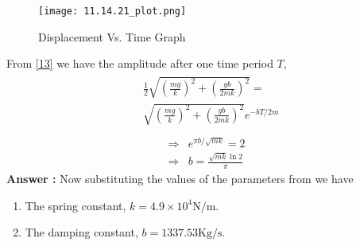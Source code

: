 \documentclass[journal,12pt,twocolumn]{IEEEtran}
\theoremstyle{remark}
\begin{document}
\begin{enumerate}
\begin{figure}[h]
    \centering
    \texttt{[image: 11.14.21\_plot.png]}
    \caption{Displacement  Vs. Time Graph}
    \label{Fig-2}
\end{figure}
From \eqref{13} we have the amplitude after one time period $T$,
\begin{align}
\begin{split}
&\frac{1}{2}\sqrt{\left(\frac{mg}{k}\right)^2+\left(\frac{gb}{2mk}\right)^2}= \\
&\sqrt{\left(\frac{mg}{k}\right)^2+\left(\frac{gb}{2mk}\right)^2}e^{-bT/2m} \label{14}\\
\end{split}
\end{align}
\begin{align}
\Rightarrow &e^{\pi b/\sqrt{mk}}=2 \label{15}\\
\Rightarrow &b=\frac{\sqrt{mk}\ln{2}}{\pi} \label{16}
\end{align}
\textbf{Answer :}
Now substituting the values of the parameters from  we have \\
\begin{enumerate}
\item  The spring constant, $k=4.9\times10^4 \text{N/m}$.
\item  The damping constant, $b=1337.53 \text{Kg/s}$.
\end{enumerate} 
\end{enumerate}
\end{document}
